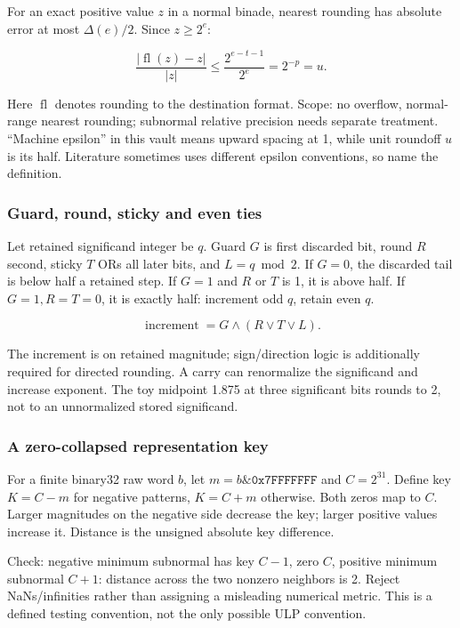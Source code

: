 For an exact positive value \(z\) in a normal binade, nearest rounding has absolute error at most \(\Delta(e)/2\). Since \(z\ge2^e\):

\[
\frac{|\operatorname{fl}(z)-z|}{|z|}
\le\frac{2^{e-t-1}}{2^e}=2^{-p}=u.
\]

Here \(\operatorname{fl}\) denotes rounding to the destination format. Scope: no overflow, normal-range nearest rounding; subnormal relative precision needs separate treatment. ``Machine epsilon'' in this vault means upward spacing at 1, while unit roundoff \(u\) is its half. Literature sometimes uses different epsilon conventions, so name the definition.

\subsubsection{Guard, round, sticky and even ties}\label{guard-round-sticky-and-even-ties}

Let retained significand integer be \(q\). Guard \(G\) is first discarded bit, round \(R\) second, sticky \(T\) ORs all later bits, and \(L=q\bmod2\). If \(G=0\), the discarded tail is below half a retained step. If \(G=1\) and \(R\) or \(T\) is 1, it is above half. If \(G=1,R=T=0\), it is exactly half: increment odd \(q\), retain even \(q\).

\[
\operatorname{increment}=G\land(R\lor T\lor L).
\]

The increment is on retained magnitude; sign/direction logic is additionally required for directed rounding. A carry can renormalize the significand and increase exponent. The toy midpoint 1.875 at three significant bits rounds to 2, not to an unnormalized stored significand.

\subsubsection{A zero-collapsed representation key}\label{a-zero-collapsed-representation-key}

For a finite binary32 raw word \(b\), let \(m=b\mathbin{\&}\texttt{0x7FFFFFFF}\) and \(C=2^{31}\). Define key \(K=C-m\) for negative patterns, \(K=C+m\) otherwise. Both zeros map to \(C\). Larger magnitudes on the negative side decrease the key; larger positive values increase it. Distance is the unsigned absolute key difference.

Check: negative minimum subnormal has key \(C-1\), zero \(C\), positive minimum subnormal \(C+1\): distance across the two nonzero neighbors is 2. Reject NaNs/infinities rather than assigning a misleading numerical metric. This is a defined testing convention, not the only possible ULP convention.

